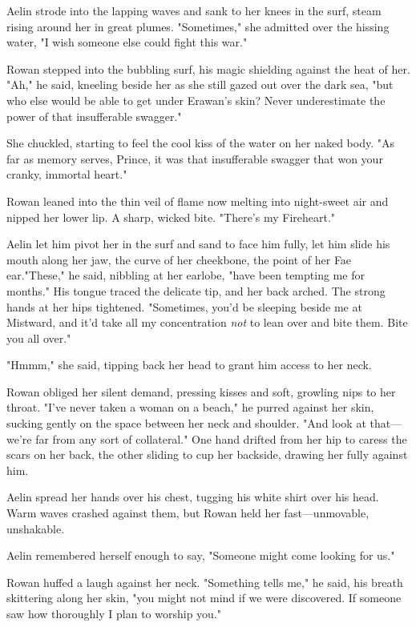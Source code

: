 Aelin strode into the lapping waves and sank to her knees in the surf, steam rising around her in great plumes. "Sometimes," she admitted over the hissing water, "I wish someone else could fight this war."

Rowan stepped into the bubbling surf, his magic shielding against the heat of her. "Ah," he said, kneeling beside her as she still gazed out over the dark sea, "but who else would be able to get under Erawan's skin? Never underestimate the power of that insufferable swagger."

She chuckled, starting to feel the cool kiss of the water on her naked body. "As far as memory serves, Prince, it was that insufferable swagger that won your cranky, immortal heart."

Rowan leaned into the thin veil of flame now melting into night-sweet air and nipped her lower lip. A sharp, wicked bite. "There's my Fireheart."

Aelin let him pivot her in the surf and sand to face him fully, let him slide his mouth along her jaw, the curve of her cheekbone, the point of her Fae ear."These," he said, nibbling at her earlobe, "have been tempting me for months." His tongue traced the delicate tip, and her back arched. The strong hands at her hips tightened. "Sometimes, you'd be sleeping beside me at Mistward, and it'd take all my concentration
\emph{not} to lean over and bite them. Bite you all over."

"Hmmm," she said, tipping back her head to grant him access to her neck.

Rowan obliged her silent demand, pressing kisses and soft, growling nips to her throat. "I've never taken a woman on a beach," he purred against her skin, sucking gently on the space between her neck and shoulder. "And look at that--- we're far from any sort of 
collateral." One hand drifted from her hip to caress the scars on her back, the other sliding to cup her backside, drawing her fully against him.

Aelin spread her hands over his chest, tugging his white shirt over his head. Warm waves crashed against them, but Rowan held her fast---unmovable, unshakable.

Aelin remembered herself enough to say, "Someone might come looking for us."

Rowan huffed a laugh against her neck. "Something tells me," he said, his breath skittering along her skin, "you might not mind if we were discovered. If someone saw how thoroughly I plan to worship you."

